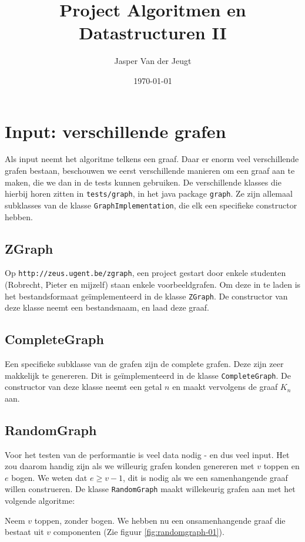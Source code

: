 \documentclass{article}
\title{Project Algoritmen en Datastructuren II}
\author{Jasper Van der Jeugt}
\date{\today}
\begin{document}
\maketitle
\tableofcontents

\section{Input: verschillende grafen}
Als input neemt het algoritme telkens een graaf. Daar er enorm veel
verschillende grafen bestaan, beschouwen we eerst verschillende manieren om een
graaf aan te maken, die we dan in de tests kunnen gebruiken. De verschillende
klasses die hierbij horen zitten in \verb#tests/graph#, in het java package
\verb#graph#. Ze zijn allemaal subklasses van de klasse
\verb#GraphImplementation#, die elk een specifieke constructor hebben.

\subsection{ZGraph}
Op \verb#http://zeus.ugent.be/zgraph#, een project gestart door enkele studenten
(Robrecht, Pieter en mijzelf) staan enkele voorbeeldgrafen. Om deze in te laden
is het bestandsformaat ge\"implementeerd in de klasse \verb#ZGraph#. De
constructor van deze klasse neemt een bestandsnaam, en laad deze graaf.

\subsection{CompleteGraph}
Een specifieke subklasse van de grafen zijn de complete grafen. Deze zijn zeer
makkelijk te genereren. Dit is ge\"implementeerd in de klasse
\verb#CompleteGraph#. De constructor van deze klasse neemt een getal $n$ en
maakt vervolgens de graaf $K_n$ aan.

\subsection{RandomGraph}
Voor het testen van de performantie is veel data nodig - en dus veel input. Het
zou daarom handig zijn als we willeurig grafen konden genereren met $v$ toppen
en $e$ bogen. We weten dat $e \geq v - 1$, dit is nodig als we een samenhangende
graaf willen construeren.  De klasse \verb#RandomGraph# maakt willekeurig grafen
aan met het volgende algoritme:
\newline

Neem $v$ toppen, zonder bogen. We hebben nu een onsamenhangende graaf die
bestaat uit $v$ componenten (Zie figuur \ref{fig:randomgraph-01}).
\newline
\end{document}
